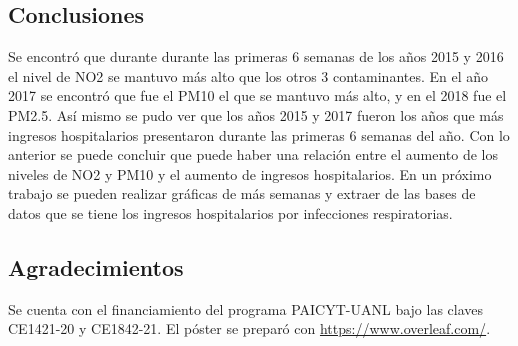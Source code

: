 \documentclass[a0]{sciposter} %
\begin{document}
\begin{multicols}{2}
\section{Conclusiones}
Se encontró que durante durante las primeras 6 semanas de los años 2015 y 2016 el nivel de NO2 se mantuvo más alto que los otros 3 contaminantes. En el año 2017 se encontró que fue el PM10 el que se mantuvo más alto, y en el 2018 fue el PM2.5. Así mismo se pudo ver que los años 2015 y 2017 fueron los años que más ingresos hospitalarios presentaron durante las primeras 6 semanas del año. 
Con lo anterior se puede concluir que puede haber una relación entre el aumento de los niveles de NO2 y PM10 y el aumento de ingresos hospitalarios.
En un próximo trabajo se pueden realizar gráficas de más semanas y extraer de las bases de datos que se tiene los ingresos hospitalarios por infecciones respiratorias.

\subsection*{Agradecimientos}

Se cuenta con el financiamiento del programa PAICYT-UANL bajo las claves CE1421-20 y CE1842-21. El póster se preparó con \url{https://www.overleaf.com/}.

\small 

    
\end{multicols}
\end{document}
